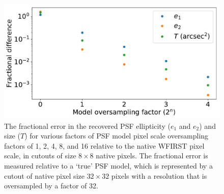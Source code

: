 \documentclass[aps,prd, amsmath,amssymb,superscriptaddress,showkeys,nofootinbib,reprint,preprintnumbers]{revtex4-1}
\begin{document}
\begin{figure}
\begin{center}
\includegraphics[width=\columnwidth]{figures/psf_oversampling.pdf}
\end{center}
\caption[]{
The fractional error in the recovered PSF ellipticity ($e_1$ and $e_2$) and size ($T$) for various factors of PSF model pixel scale oversampling factors of 1, 2, 4, 8, and 16 relative to the native WFIRST pixel scale, in cutouts of size $8\times 8$ native pixels. The fractional error is measured relative to a `true' PSF model, which is represented by a cutout of native pixel size $32\times32$ pixels with a resolution that is oversampled by a factor of 32.
\label{fig:psf_oversampling}}
\end{figure}





\label{lastpage}
\end{document}
